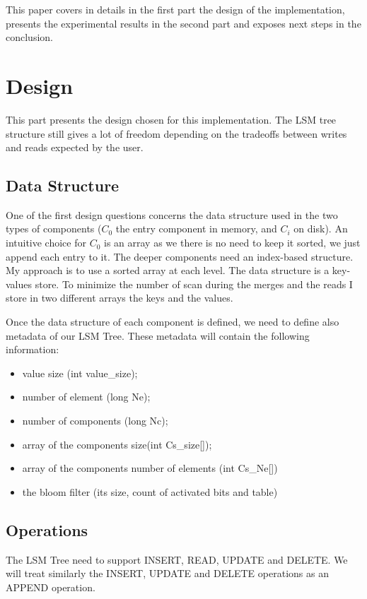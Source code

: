 \documentclass{sig-alternate-05-2015}
\begin{document}
This paper covers in details in the first part the design of the implementation, presents the experimental results in the second part and exposes next steps in the conclusion.

\section{Design}

This part presents the design chosen for this implementation. The LSM tree structure still gives a lot of freedom depending on the tradeoffs between writes and reads expected by the user.

\subsection{Data Structure}

One of the first design questions concerns the data structure used in the two types of components ($C_0$ the entry component in memory, and $C_i$ on disk). An intuitive choice for $C_0$ is an array as we there is no need to keep it sorted, we just append each entry to it. The deeper components need an index-based structure. My approach is to use a sorted array at each level. The data structure is a key-values store. To minimize the number of scan during the merges and the reads I store in two different arrays the keys and the values.

Once the data structure of each component is defined, we need to define also metadata of our LSM Tree. These metadata will contain the following information:
\begin{itemize}
	\item value size (int value\_size);
	\item number of element (long Ne);
	\item number of components (long Nc);
	\item array of the components size(int Cs\_size[]);
	\item array of the components number of elements (int Cs\_Ne[])
	\item the bloom filter (its size, count of activated bits and table)
\end{itemize}
			
\subsection{Operations}
The LSM Tree need to support INSERT, READ, UPDATE and DELETE. We will treat similarly the INSERT, UPDATE and DELETE operations as an APPEND operation.
\end{document}
